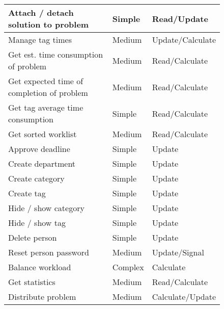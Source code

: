 \begin{figure}[hpt]
\begin{center}
\begin{tabular}{|l|l|l|}
Attach / detach solution to problem	&   Simple & Read/Update   \\ \hline%
Manage tag times &   Medium & Update/Calculate \\ \hline
Get est. time consumption of problem					&   Medium & Read/Calculate   \\ \hline%
Get expected time of completion of problem					&   Medium & Read/Calculate   \\ \hline%
Get tag average time consumption					&   Simple & Read/Calculate   \\ \hline%
Get sorted worklist 								&   Medium & Read/Calculate   \\ \hline%
Approve deadline 						&   Simple & Update   \\ \hline%
Create department 					&   Simple & Update   \\ \hline%
Create category 						&   Simple & Update   \\ \hline%
Create tag									&   Simple & Update   \\ \hline%
Hide / show category				&   Simple & Update   \\ \hline%
Hide / show tag							&   Simple & Update   \\ \hline%
Delete person 							&   Simple & Update   \\ \hline%
Reset person password 			&   Medium & Update/Signal   \\ \hline%
Balance workload 						&   Complex & Calculate   \\ \hline%
Get statistics							&   Medium & Read/Calculate   \\ \hline%
Distribute problem & Medium & Calculate/Update \\ \hline%
\end{tabular}
\end{center}
\label{tab:functionlist}
\end{figure}

